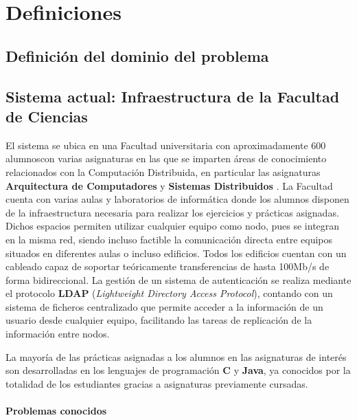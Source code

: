 \section{Definiciones}

\subsection{Definición del dominio del problema}


\subsection{Sistema actual: Infraestructura de la Facultad de Ciencias}
\label{dominioproblema:infraestructura}
El sistema se ubica en una Facultad universitaria con aproximadamente 600 alumnos\citationneeded con varias asignaturas en las que se imparten áreas de conocimiento relacionados con la Computación Distribuida, en particular las asignaturas \textbf{Arquitectura de Computadores} y \textbf{Sistemas Distribuidos} \cite{DIA15GuiaAcademica}. La Facultad cuenta con varias aulas y laboratorios de informática donde los alumnos disponen de la infraestructura necesaria para realizar los ejercicios y prácticas asignadas. Dichos espacios permiten utilizar cualquier equipo como nodo, pues se integran en la misma red, siendo incluso factible la comunicación directa entre equipos situados en diferentes aulas o incluso edificios. Todos los edificios cuentan con un cableado capaz de soportar teóricamente transferencias de hasta 100Mb/s de forma bidireccional\citationneeded. La gestión de un sistema de autenticación se realiza mediante el protocolo \textbf{LDAP} (\textit{Lightweight Directory Access Protocol})\cite{RFC4516-comment}, contando con un sistema de ficheros centralizado que permite acceder a la información de un usuario desde cualquier equipo, facilitando las tareas de replicación de la información entre nodos.

La mayoría de las prácticas asignadas a los alumnos en las asignaturas de interés son desarrolladas en los lenguajes de programación \textbf{C} y \textbf{Java}, ya conocidos por la totalidad de los estudiantes gracias a asignaturas previamente cursadas.

\paragraph{Problemas conocidos}

